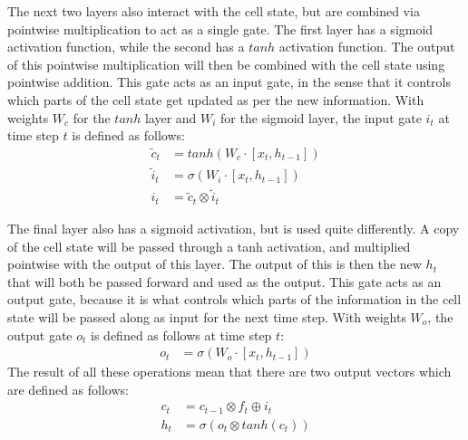 \noindent
The next two layers also interact with the cell state, but are combined via pointwise multiplication to act as a single gate. The first layer has a sigmoid activation function, while the second has a $tanh$ activation function. The output of this pointwise multiplication will then be combined with the cell state using pointwise addition. This gate acts as an input gate, in the sense that it controls which parts of the cell state get updated as per the new information. With weights $W_c$ for the $tanh$ layer and $W_i$ for the sigmoid layer, the input gate $i_t$ at time step $t$ is defined as follows:
\begin{align}
    \tilde{c}_t &= tanh(W_c \cdot [x_t,h_{t-1}]) \\
    \tilde{i}_t &= \sigma (W_i \cdot [x_t,h_{t-1}]) \\
    i_t &= \tilde{c}_t \otimes \tilde{i}_t
\end{align}

\noindent
The final layer also has a sigmoid activation, but is used quite differently. A copy of the cell state will be passed through a tanh activation, and multiplied pointwise with the output of this layer. The output of this is then the new $h_t$ that will both be passed forward and used as the output. This gate acts as an output gate, because it is what controls which parts of the information in the cell state will be passed along as input for the next time step.
With weights $W_o$, the output gate $o_t$ is defined as follows at time step $t$:
\begin{align}
    o_t &= \sigma(W_o \cdot [x_t,h_{t-1}])
\end{align}
The result of all these operations mean that there are two output vectors which are defined as follows:
\begin{align}
    c_t &= c_{t-1} \otimes f_t \oplus i_t \\
    h_t &= \sigma (o_t \otimes tanh (c_t))
\end{align}

